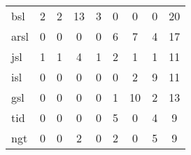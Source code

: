 \begin{table}[ht!]
{\begin{tabular}{l|ccccccc|c}
            \acrshort{bsl}                                                                                        & \cellcolor[HTML]{FFFCF6}2                        & \cellcolor[HTML]{FFFCF6}2 & \cellcolor[HTML]{FFECC7}13 & \cellcolor[HTML]{FFFBF2}3  & 0                          & 0                          & 0                          & 20                                              \\
            \acrshort{arsl}                                                                                       & 0                                                & 0                         & 0                          & 0                          & \cellcolor[HTML]{FFF6E5}6  & \cellcolor[HTML]{FFF5E1}7  & \cellcolor[HTML]{FFF9EE}4  & 17                                              \\
            \acrshort{jsl}                                                                                        & \cellcolor[HTML]{FFFEFB}1                        & \cellcolor[HTML]{FFFEFB}1 & \cellcolor[HTML]{FFF9EE}4  & \cellcolor[HTML]{FFFEFB}1  & \cellcolor[HTML]{FFFCF6}2  & \cellcolor[HTML]{FFFEFB}1  & \cellcolor[HTML]{FFFEFB}1  & 11                                              \\
            \acrshort{isl}                                                                                        & 0                                                & 0                         & 0                          & 0                          & 0                          & \cellcolor[HTML]{FFFCF6}2  & \cellcolor[HTML]{FFF5E1}9  & 11                                              \\
            \acrshort{gsl}                                                                                        & 0                                                & 0                         & 0                          & 0                          & \cellcolor[HTML]{FFFEFB}1  & \cellcolor[HTML]{FFF1D4}10 & \cellcolor[HTML]{FFFCF6}2  & 13                                              \\
            \acrshort{tid}                                                                                        & 0                                                & 0                         & 0                          & 0                          & \cellcolor[HTML]{FFF8EA}5  & 0                          & \cellcolor[HTML]{FFF9EE}4  & 9                                               \\
            \acrshort{ngt}                                                                                        & 0                                                & 0                         & \cellcolor[HTML]{FFFCF6}2  & 0                          & \cellcolor[HTML]{FFFCF6}2  & 0                          & \cellcolor[HTML]{FFF8EA}5  & 9                                               \\

\end{tabular}}
\end{table}
